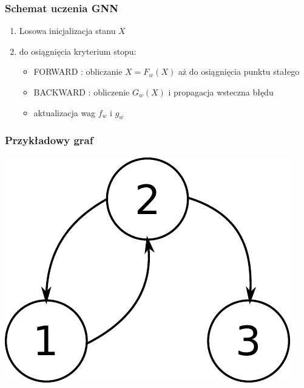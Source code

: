 \documentclass{beamer}
\begin{document}
\begin{frame}
\frametitle{Schemat uczenia GNN}
\begin{enumerate}
	\item Losowa inicjalizacja stanu $X$
	\item do osiągnięcia kryterium stopu:
	\begin{itemize}
		\item FORWARD : obliczanie $X = F_w(X)$ aż do osiągnięcia punktu stałego
		\item BACKWARD : obliczenie $G_w(X)$ i propagacja wsteczna błędu
		\item aktualizacja wag $f_w$ i $g_w$
	\end{itemize}
\end{enumerate}
\end{frame}

\begin{frame}
\frametitle{Przykładowy graf}
\begin{center}
	\includegraphics[scale=0.4]{img/graph}
\end{center}
\end{frame}
\end{document}
